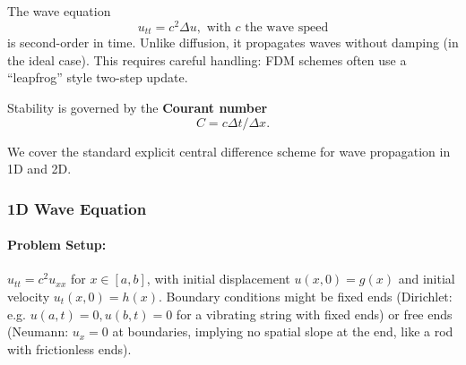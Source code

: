 \documentclass[a4paper,11pt]{report}
\begin{document}
The wave equation
$$
    u_{tt} = c^2 \Delta u, \text{ with } c \text{ the wave speed}
$$
is second-order in time. Unlike diffusion, it propagates waves without damping (in the ideal case).
This requires careful handling: FDM schemes often use a “leapfrog” style two-step update.

Stability is governed by the \textbf{Courant number}
$$C = c\Delta t/\Delta x.$$

We cover the standard explicit central difference scheme for wave propagation in 1D and 2D.

\subsubsection{1D Wave Equation}
\paragraph{Problem Setup:}
$u_{tt} = c^2 u_{xx}$ for $x\in[a,b]$, with initial displacement $u(x,0)=g(x)$ and initial velocity $u_t(x,0)=h(x)$. Boundary conditions might be fixed ends (Dirichlet: e.g. $u(a,t)=0, u(b,t)=0$ for a vibrating string with fixed ends) or free ends (Neumann: $u_x=0$ at boundaries, implying no spatial slope at the end, like a rod with frictionless ends).
\end{document}
